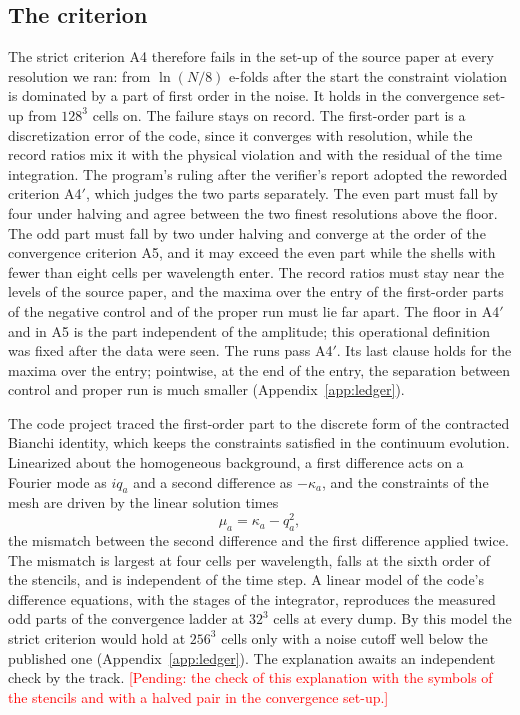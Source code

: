 \documentclass[aps,prd,twocolumn,10pt,superscriptaddress,nofootinbib,longbibliography,floatfix]{revtex4-2}
\newcommand{\pending}[1]{\textcolor{red}{[Pending: #1]}}
\begin{document}
\subsection{The criterion}\label{sec:a4}

The strict criterion A4 therefore fails in the set-up of the source paper at every resolution we ran: from $\ln(N/8)$ e-folds after the start the constraint violation is dominated by a part of first order in the noise. It holds in the convergence set-up from $128^3$ cells on. The failure stays on record. The first-order part is a discretization error of the code, since it converges with resolution, while the record ratios mix it with the physical violation and with the residual of the time integration. The program's ruling after the verifier's report adopted the reworded criterion A4$'$, which judges the two parts separately. The even part must fall by four under halving and agree between the two finest resolutions above the floor. The odd part must fall by two under halving and converge at the order of the convergence criterion A5, and it may exceed the even part while the shells with fewer than eight cells per wavelength enter. The record ratios must stay near the levels of the source paper, and the maxima over the entry of the first-order parts of the negative control and of the proper run must lie far apart. The floor in A4$'$ and in A5 is the part independent of the amplitude; this operational definition was fixed after the data were seen. The runs pass A4$'$. Its last clause holds for the maxima over the entry; pointwise, at the end of the entry, the separation between control and proper run is much smaller (Appendix~\ref{app:ledger}).

The code project traced the first-order part to the discrete form of the contracted Bianchi identity, which keeps the constraints satisfied in the continuum evolution. Linearized about the homogeneous background, a first difference acts on a Fourier mode as $iq_a$ and a second difference as $-\kappa_a$, and the constraints of the mesh are driven by the linear solution times
\begin{equation}\label{eq:mu}
\mu_a=\kappa_a-q_a^2,
\end{equation}
the mismatch between the second difference and the first difference applied twice. The mismatch is largest at four cells per wavelength, falls at the sixth order of the stencils, and is independent of the time step. A linear model of the code's difference equations, with the stages of the integrator, reproduces the measured odd parts of the convergence ladder at $32^3$ cells at every dump. By this model the strict criterion would hold at $256^3$ cells only with a noise cutoff well below the published one (Appendix~\ref{app:ledger}). The explanation awaits an independent check by the track. \pending{the check of this explanation with the symbols of the stencils and with a halved pair in the convergence set-up.}
\end{document}

